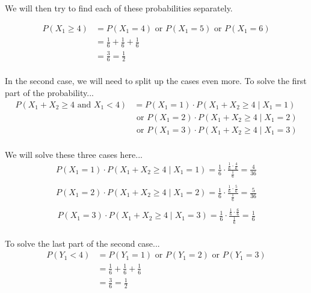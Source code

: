 \documentclass{article}
\numberwithin{equation}{section}
\newcommand{\A}{\text{ and }}
\newcommand{\R}{\text{ or }}
\newcommand{\eqname}[1]{\tag*{#1}}%
\begin{document}
We will then try to find each of these probabilities separately.

\begin{align} 
    \label{X_1 >= 4}
        P(X_1 \geq 4) &= P(X_1 = 4) \R P(X_1 = 5) \R P(X_1 = 6) \eqname{Using (2.2)} \\ 
        &= \frac{1}{6} + \frac{1}{6} + \frac{1}{6} \eqname{} \\
        &= \frac{3}{6} = \frac{1}{2} \eqname{} \\
\end{align}

In the second case, we will need to split up the cases even more. To solve the first part of the probability...
\begin{align} 
	    \label{P(X1+X2≥4 and X1<4}
        P(X_1 + X_2 \geq 4 \A X_1 < 4) &= P(X_1 = 1) \cdot P(X_1 + X_2 \geq 4 \mid X_1 = 1) \eqname{Using (2.2)} \\
        & \R P(X_1 = 2) \cdot P(X_1 + X_2 \geq 4 \mid X_1 = 2) \eqname{} \\ 
        & \R P(X_1 = 3) \cdot P(X_1 + X_2 \geq 4 \mid X_1 = 3) \eqname{} \\
\end{align}

We will solve these three cases here...
\begin{align} 
	    \label{P(X1= 1)·P(X1+X2≥4|X1= 1)}
        P(X_1 = 1) \cdot P(X_1 + X_2 \geq 4 \mid X_1 = 1) = \frac{1}{6}\cdot \frac{\frac{1}{6} \cdot \frac{4}{6}}{\frac{1}{6}} = \frac{4}{36}  \eqname{Using (2.7) (2.8)} \\
\end{align}
\begin{align} 
	    \label{P(X1= 2)·P(X1+X2≥4|X1= 2)}
        P(X_1 = 2) \cdot P(X_1 + X_2 \geq 4 \mid X_1 = 2) = \frac{1}{6}\cdot \frac{\frac{1}{6} \cdot \frac{5}{6}}{\frac{1}{6}} = \frac{5}{36} \eqname{Using (2.7) (2.8)} \\
\end{align}
\begin{align} 
	    \label{P(X1=3)·P(X1+X2≥4|X1=3)}
        P(X_1 = 3) \cdot P(X_1 + X_2 \geq 4 \mid X_1 = 3) = \frac{1}{6}\cdot \frac{\frac{1}{6} \cdot \frac{6}{6}}{\frac{1}{6}} = \frac{1}{6} \eqname{Using (2.7) (2.8)} \\
\end{align}

To solve the last part of the second case...
\begin{align} 
	    \label{P(Y_1 < 4)}
	    P(Y_1 < 4) &= P(Y_1 = 1) \R P(Y_1 = 2) \R P(Y_1 = 3)   \eqname{Using (2.2)} \\
	    &= \frac{1}{6} + \frac{1}{6} + \frac{1}{6} \eqname{Using (2.6)}  \\
	    &= \frac{3}{6} = \frac{1}{2}  \eqname{} \\
\end{align}
\end{document}
